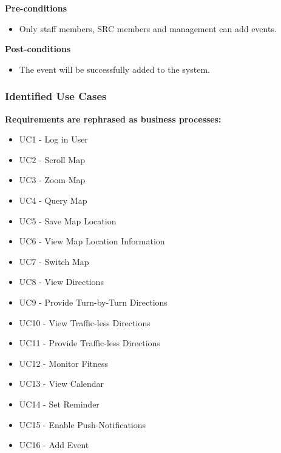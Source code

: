 \documentclass[runningheads,a4paper]{article}
\begin{document}
  
\textbf{Pre-conditions}
\begin{itemize}
	\item Only staff members, SRC members and management can add events.
\end{itemize}
  
\textbf{Post-conditions}
\begin{itemize}
  	\item The event will be successfully added to the system.
\end{itemize}

\subsubsection{Identified Use Cases}
\textbf{Requirements are rephrased as business processes:}
\begin{itemize}
	\item UC1 - Log in User
	\item UC2 - Scroll Map
	\item UC3 - Zoom Map
	\item UC4 - Query Map
	\item UC5 - Save Map Location
	\item UC6 - View Map Location Information
	\item UC7 - Switch Map
	\item UC8 - View Directions
	\item UC9 - Provide Turn-by-Turn Directions
	\item UC10 - View Traffic-less Directions
	\item UC11 - Provide Traffic-less Directions
	\item UC12 - Monitor Fitness
	\item UC13 - View Calendar
	\item UC14 - Set Reminder
	\item UC15 - Enable Push-Notifications
	\item UC16 - Add Event 
\end{itemize}

\pagebreak
\end{document}
